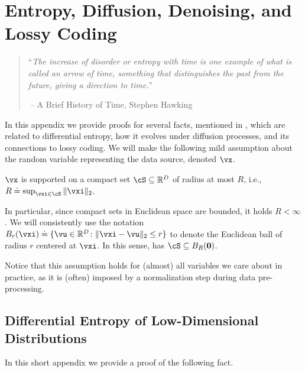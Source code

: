 \documentclass[../../book-main.tex]{subfiles}
\begin{document}
\chapter{Entropy, Diffusion, Denoising, and Lossy Coding}\label{app:entropy}\label{app:diffusion-denoising}

\begin{quote}
``{\em The increase of disorder or entropy with time is one example of what is called an arrow of time, something that distinguishes the past from the future, giving a direction to time.}''

$~$\hfill -- A Brief History of Time, Stephen Hawking
 \end{quote}
\vspace{5mm}

In this appendix we provide proofs for several facts, mentioned in
, which are related to differential entropy, how
it evolves under diffusion processes, and its connections to lossy coding. We
will make the following mild assumption about the random variable representing
the data source, denoted \(\vx\).

\begin{assumption}\label{assumption:entropy_x_compact_support}
    \(\vx\) is supported on a compact set \(\cS \subseteq \R^{D}\) of radius at most \(R\), i.e., \(R \doteq \sup_{\vxi \in \cS}\norm{\vxi}_{2}\).
\end{assumption}

In particular, since compact sets in Euclidean space are bounded, it holds \(R < \infty\). We will consistently use the notation \(B_{r}(\vxi) \doteq \{\vu \in \R^{D} \colon \norm{\vxi - \vu}_{2} \leq r\}\) to denote the Euclidean ball of radius \(r\) centered at \(\vxi\). In this sense,  has \(\cS \subseteq B_{R}(\vzero)\).

Notice that this assumption holds for (almost) all variables we care about in practice, as it is (often) imposed by a normalization step during data pre-processing. 

\section{Differential Entropy of Low-Dimensional Distributions}\label{sec:low_dim_entropy}

In this short appendix we provide a proof of the following fact.
\end{document}
